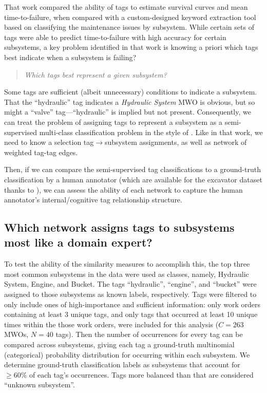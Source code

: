 \documentclass[%
	12pt,
		oneside,
		letterpaper
]{book}
\begin{document}
That work compared the ability of tags to estimate survival curves and
mean time-to-failure, when compared with a custom-designed keyword
extraction tool based on classifying the maintenance issues by
subsystem. While certain sets of tags were able to predict
time-to-failure with high accuracy for certain subsystems, a key problem
identified in that work is knowing a priori which tags best indicate
when a subsystem is failing?

\begin{quote}
\emph{Which tags best represent a given subsystem?}
\end{quote}

Some tags are sufficient (albeit unnecessary) conditions to indicate a
subsystem. That the ``hydraulic'' tag indicates a \emph{Hydraulic
System} MWO is obvious, but so might a ``valve'' tag---``hydraulic'' is
implied but not present. Consequently, we can treat the problem of
assigning tags to represent a subsystem as a semi-supervised multi-class
classification problem in the style of
\textcite{Semisupervisedlearning_Avrachenkov2017}. Like in that work, we
need to know a selection tag\(\rightarrow\)subsystem assignments, as
well as network of weighted tag-tag edges.

Then, if we can compare the semi-supervised tag classifications to a
ground-truth classification by a human annotator (which are available
for the excavator dataset thanks to
\textcite{sharedreliabilitydatabase_Ho2015}), we can assess the ability
of each network to capture the human annotator's internal/cognitive tag
relationship structure.

\subsection{Which network assigns tags to subsystems most like a domain
expert?}\label{which-network-assigns-tags-to-subsystems-most-like-a-domain-expert}

To test the ability of the similarity measures to accomplish this, the
top three most common subsystems in the data were used as classes,
namely, Hydraulic System, Engine, and Bucket. The tags ``hydraulic'',
``engine'', and ``bucket'' were assigned to those subsystems as known
labels, respectively. Tags were filtered to only include ones of
high-importance and sufficient information: only work orders containing
at least 3 unique tags, and only tags that occurred at least 10 unique
times within the those work orders, were included for this analysis
(\(C=263\) MWOs, \(N=40\) tags). Then the number of occurrences for
every tag can be compared across subsystems, giving each tag a
ground-truth multinomial (categorical) probability distribution for
occurring within each subsystem. We determine ground-truth
classification labels as subsystems that account for \(\geq60\%\) of
each tag's occurrences. Tags more balanced than that are considered
``unknown subsystem''.
\end{document}
